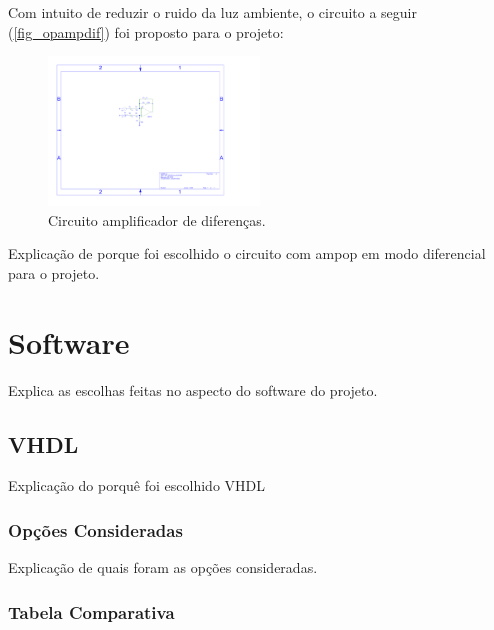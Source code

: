 	Com intuito de reduzir o ruido da luz ambiente, o circuito a seguir (\autoref{fig_opampdif}) foi proposto para o projeto:
	
	\begin{figure}[htb]
		\caption{\label{fig_opampdif}Circuito amplificador de diferenças.}
		\begin{center}
			\includegraphics[width=0.5\textwidth, trim={9.5cm 11.2cm 15cm 5.76cm},clip]{opamp-dif.pdf}
		\end{center}
	\end{figure}
	
	Explicação de porque foi escolhido o circuito com ampop em modo diferencial para o projeto.
	
	\section{Software}\label{sec-software}
	
	Explica as escolhas feitas no aspecto do software do projeto.
	
	\subsection{VHDL}\label{soft-vhdl}
	
	Explicação do porquê foi escolhido VHDL
	
	\subsubsection{Opções Consideradas}\label{vhdl-options}
	
	Explicação de quais foram as opções consideradas.
	
	\subsubsection{Tabela Comparativa}\label{vhdl-table}
	
